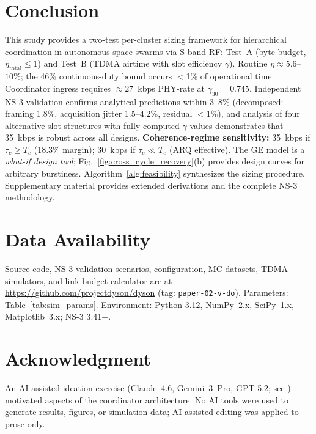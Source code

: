 \documentclass[journal]{IEEEtran}
\begin{document}
\section{Conclusion}

This study provides a two-test per-cluster sizing framework for hierarchical coordination in autonomous space swarms via S-band RF: Test~A (byte budget, $\eta_{\text{total}} \leq 1$) and Test~B (TDMA airtime with slot efficiency $\gamma$). Routine $\eta \approx 5.6$--$10\%$; the 46\% continuous-duty bound occurs $<$1\% of operational time. Coordinator ingress requires ${\approx}27$~kbps PHY-rate at $\gamma_{30} = 0.745$. Independent NS-3 validation confirms analytical predictions within 3--8\% (decomposed: framing 1.8\%, acquisition jitter 1.5--4.2\%, residual $<$1\%), and analysis of four alternative slot structures with fully computed $\gamma$ values demonstrates that 35~kbps is robust across all designs. \textbf{Coherence-regime sensitivity:} 35~kbps if $\tau_c \geq T_c$ (18.3\% margin); 30~kbps if $\tau_c \ll T_c$ (ARQ effective). The GE model is a \emph{what-if design tool}; Fig.~\ref{fig:cross_cycle_recovery}(b) provides design curves for arbitrary burstiness. Algorithm~\ref{alg:feasibility} synthesizes the sizing procedure. Supplementary material provides extended derivations and the complete NS-3 methodology.

\section*{Data Availability}

Source code, NS-3 validation scenarios, configuration, MC datasets, TDMA simulators, and link budget calculator are at \url{https://github.com/projectdyson/dyson} (tag: \texttt{paper-02-v-do}). Parameters: Table~\ref{tab:sim_params}. Environment: Python 3.12, NumPy~2.x, SciPy~1.x, Matplotlib~3.x; NS-3 3.41+.

\section*{Acknowledgment}

An AI-assisted ideation exercise (Claude~4.6, Gemini~3~Pro, GPT-5.2; see \cite{dyson_multimodel}) motivated aspects of the coordinator architecture. No AI tools were used to generate results, figures, or simulation data; AI-assisted editing was applied to prose only.
\end{document}
